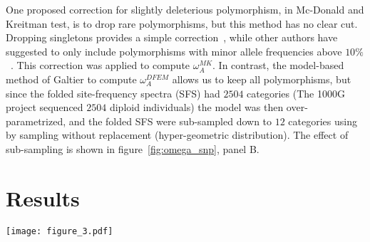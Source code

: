 \documentclass{article}
\begin{document}
One proposed correction for slightly deleterious polymorphism, in Mc-Donald and Kreitman test, is to drop rare polymorphisms, but this method has no clear cut.
Dropping singletons provides a simple correction~\citep{templeton_contingency_1996}, while other authors have suggested to only include polymorphisms with minor allele frequencies above $10\%$~\citep{smith_adaptive_2002, fay_testing_2002, gojobori_adaptive_2007}.
This correction was applied  to compute $\omega_A^{MK}$.
In contrast, the model-based method of Galtier to compute $\omega_A^{DFEM}$ allows us to keep all polymorphisms, but since the folded site-frequency spectra (SFS) had $2504$ categories (The 1000G project sequenced $2504$ diploid individuals) the model was then over-parametrized, and the folded SFS were sub-sampled down to $12$ categories using by sampling without replacement (hyper-geometric distribution).
The effect of sub-sampling is shown in figure~\ref{fig:omega_snp}, panel B.

\section*{Results}

\begin{figure*}[hb!]
	\centering
	\texttt{[image: figure\_3.pdf]}
	\caption{ \textbf{Empirical distribution of $\omega_A^{MK}$}
		\textbf{Panel A:} $\omega_A^{MK}$ was computed on the concatenate of the $27$ CDS having a high rate of adaptation (outliers, orange solid line), detected in phylogeny-based method.
The result was compared to the empirical null distribution of $\omega_A^{MK}$ (green histogram), obtained by randomly sampling a subset of $27$ CDS from the $1,355$ CDS ($100,000$ replicates).
The deviation is not significant ($p_{\mathrm{value}}=0.119$).
		\textbf{Panel B:} Sub-sampling the site-frequency-spectrum (SFS) did not affect much the estimation of $\omega_A^{DFEM}$.
The dashed line is the $95 \%$ confidence interval around the mean value computed for random sample of $27$ CDS.
		\textbf{Panel C:} Synonymous versus non-synonymous folded SFS,  sub-sampled down to $12$ categories.
On top the SFS in the $27$ outliers.
On bottom the SFS of all CDS.
		\textbf{Panel D:}.
$\omega_A^{DFEM}$ was computed on the concatenate of the $27$ CDS having a high rate of adaptation (outliers, orange solid line), detected in phylogeny-based method.
The result was compared to the null empirical distribution of $\omega_A^{DFEM}$ (green histogram), obtained by randomly sampling a subset of $27$ CDS from the $1,355$ CDS ($100,000$ replicates).
\label{fig:omega_snp}}
\end{figure*}
\end{document}
